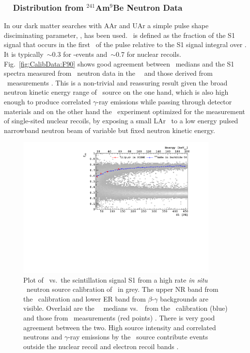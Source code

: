 \subsubsection{\tpc\ \FNinety\ Distribution from $^{241}$Am$^9$Be Neutron Data}\label{sec:CalibData:NR}
In our dark matter searches with AAr \cite{Agnes:2015gu} and UAr \cite{Agnes:2015_uar} a simple pulse shape disciminating parameter, \FNinety, has been used. \FNinety\ is defined as the fraction of the S1 signal that occurs in the first \timefno\ of the pulse relative to the S1 signal integral over \fixedintone. It is typically~$\sim$\num{0.3} for \bg-events and~$\sim$\num{0.7} for nuclear recoils. Fig.~\ref{fig:CalibData:F90} shows good agreement between \FNinety\ medians and the S1 spectra measured from \AmBe\ neutron data in the \dsf\ \tpc\ and those derived from \SCENE\ measurements \cite{Alexander:2013ke, Cao:2015ks}. This is a non-trivial and reassuring result given the broad neutron kinetic energy range of \AmBe\ source on the one hand, which is also high enough to produce correlated $\gamma$-ray emissions while passing through detector materials and on the other hand the \scene\ experiment optimized for the measurement of single-sited nuclear recoils, by exposing a small LAr \tpc\ to a low energy pulsed narrowband neutron beam of variable but fixed neutron kinetic energy.

\begin{figure}[htbp]
\centering
\includegraphics[width=0.9\textwidth]{./Figures/DSf-UArAmBeDMSStCut.pdf}
\caption{Plot of \FNinety\ vs.~the scintillation signal S1 from a high rate {\it in situ} \AmBe\ neutron source calibration of \dsf\ in grey. The upper NR band from the \AmBe\ calibration and lower ER band from $\beta$-$\gamma$ backgrounds are visible. Overlaid are the \FNinety\ \NR\ medians vs.~\SOne\ from the \AmBe\ calibration (blue) and those from \SCENE\ measurements (red points) \cite{Alexander:2013ke, Cao:2015ks}. There is very good agreement between the two.  High source intensity and correlated neutrons and $\gamma$-ray emissions by the \AmBe\ source contribute events outside the nuclear recoil and electron recoil bands \cite{Agnes:2015_uar}.\label{fig:CalibData:F90}\label{fig:DSf-UArAmBeDMS}} 
\end{figure}


